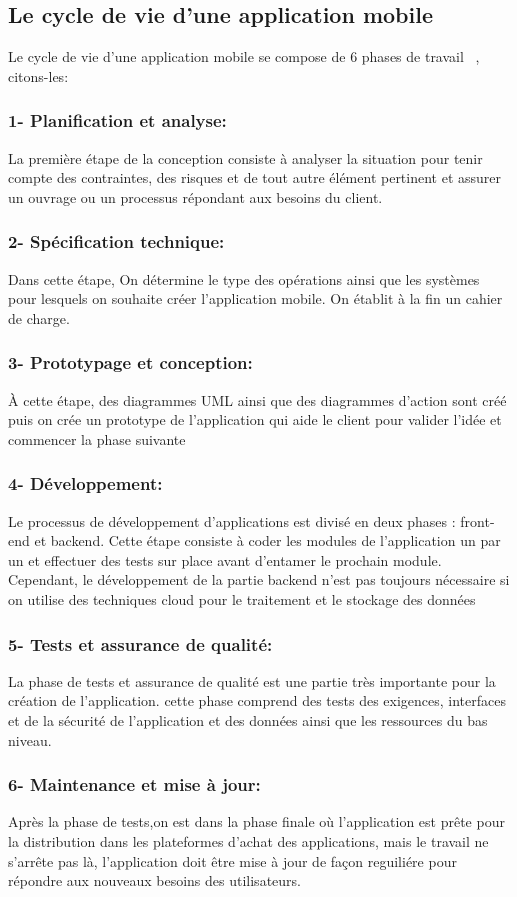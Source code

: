 \subsection{Le cycle de vie d'une application mobile}
Le cycle de vie d'une application mobile se compose de 6 phases de travail ~\cite{CycleVieDeveloppement}, citons-les:
     
\subsubsection{1- Planification et analyse:}
La première étape de la conception consiste à analyser la situation pour tenir compte des contraintes, des risques et de tout autre élément pertinent et assurer un ouvrage ou un processus répondant aux besoins du client.
\subsubsection{2- Spécification technique:}
Dans cette étape, On détermine le type des opérations ainsi que les systèmes pour lesquels on souhaite créer l'application mobile. On établit à la fin un cahier de charge.

\subsubsection{3- Prototypage et conception:}
À cette étape, des diagrammes UML ainsi que des diagrammes d'action sont créé puis on crée un prototype de l'application qui aide le client pour valider l'idée et commencer la phase suivante
\subsubsection{4- Développement:}
Le processus de développement d'applications est divisé en deux phases : front-end et backend. Cette étape consiste à coder les modules de l'application un par un et effectuer des tests sur place avant d'entamer le prochain module. Cependant, le développement de la partie backend n'est pas toujours nécessaire si on utilise des techniques cloud pour le traitement et le stockage des données 
\subsubsection{5- Tests et assurance de qualité:}
La phase de tests et assurance de qualité est une partie très importante pour la création de l'application. cette phase comprend des tests des exigences, interfaces et de la sécurité de l'application et des données ainsi que les ressources du bas niveau.
\subsubsection{6- Maintenance et mise à jour:}
Après la phase de tests,on est dans la phase finale où l'application est prête pour la distribution dans les plateformes d'achat des applications, mais le travail ne s'arrête pas là, l'application doit être mise à jour de façon reguiliére pour répondre aux nouveaux besoins des utilisateurs. 


